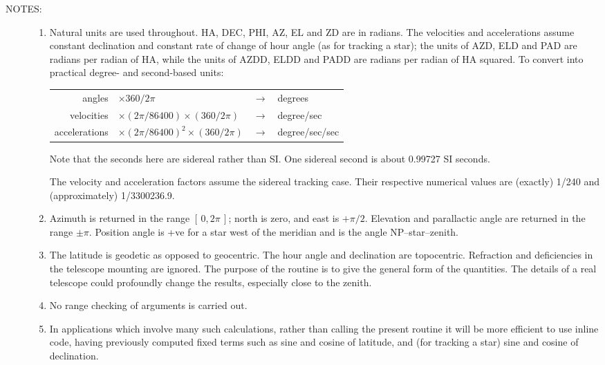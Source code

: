 \documentclass[11pt,twoside,nolof]{starlink}
\newcommand{\notes}[1]
 {
   \begin{description}
     \item[NOTES:]
         #1
   \end{description}
}
\begin{document}
\notes
{
 \begin{enumerate}
  \setlength{\parskip}{\medskipamount}
  \item Natural units are used throughout.  HA, DEC, PHI, AZ, EL
        and ZD are in radians.  The velocities and accelerations
        assume constant declination and constant rate of change of
        hour angle (as for tracking a star);  the units of AZD, ELD
        and PAD are radians per radian of HA, while the units of AZDD,
        ELDD and PADD are radians per radian of HA squared.  To
        convert into practical degree- and second-based units:

        \begin{center}
        \begin{tabular}{rlcl}
                  angles & $\times 360/2\pi$ & $\rightarrow$ & degrees \\
              velocities & $\times (2\pi/86400) \times (360/2\pi)$
                                             & $\rightarrow$ & degree/sec \\
           accelerations & $\times (2\pi/86400)^2 \times (360/2\pi)$
                                             & $\rightarrow$ & degree/sec/sec \\
        \end{tabular}
        \end{center}

        Note that the seconds here are sidereal rather than SI.  One
        sidereal second is about 0.99727 SI seconds.

        The velocity and acceleration factors assume the sidereal
        tracking case.  Their respective numerical values are (exactly)
        1/240 and (approximately) 1/3300236.9.
  \item Azimuth is returned in the range $[\,0,2\pi\,]$;  north is zero,
        and east is $+\pi/2$.  Elevation and parallactic angle are
        returned in the range $\pm\pi$.  Position angle is +ve
        for a star west of the meridian and is the angle NP--star--zenith.
  \item The latitude is geodetic as opposed to geocentric.  The
        hour angle and declination are topocentric.  Refraction and
        deficiencies in the telescope mounting are ignored.  The
        purpose of the routine is to give the general form of the
        quantities.  The details of a real telescope could profoundly
        change the results, especially close to the zenith.
  \item No range checking of arguments is carried out.
  \item In applications which involve many such calculations, rather
        than calling the present routine it will be more efficient to
        use inline code, having previously computed fixed terms such
        as sine and cosine of latitude, and (for tracking a star)
        sine and cosine of declination.
 \end{enumerate}
}
\end{document}
